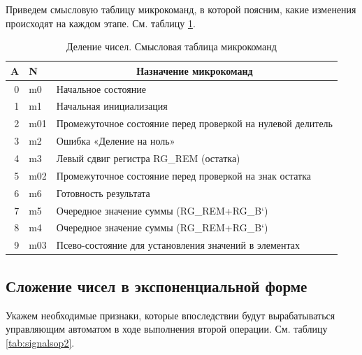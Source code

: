 \documentclass[a4paper,14pt]{extarticle}
\begin{document}
Приведем смысловую таблицу микрокоманд, в которой поясним, какие изменения происходят на каждом этапе. См. таблицу \ref{tab:coursedivmeaning}.
\begin{table}[h!]
		\small
	\begin{tabular}{|r||l|l|}

		\hline
		\multicolumn{1}{|l||}{\textbf{A}} & \textbf{N} & \multicolumn{1}{c|}{\textbf{Назначение микрокоманд}} \\ \hline\hline
		0 & m0 & Начальное состояние \\ \hline
		1 & m1 & Начальная инициализация \\ \hline
		2 & m01 & Промежуточное состояние перед проверкой на нулевой делитель \\ \hline
		3 & m2 & Ошибка «Деление на ноль» \\ \hline
		4 & m3 & Левый сдвиг регистра RG\_REM (остатка) \\ \hline
		5 & m02 & Промежуточное состояние перед проверкой на знак остатка \\ \hline
		6 & m6 & Готовность результата \\ \hline
		7 & m5 & Очередное значение суммы (RG\_REM+RG\_B`) \\ \hline
		8 & m4 & Очередное значение суммы (RG\_REM+RG\_B`) \\ \hline
		9 & m03 & Псево-состояние для установления значений в элементах \\ \hline
	\end{tabular}
	\caption{Деление чисел. Смысловая таблица микрокоманд}
	\label{tab:coursedivmeaning}
\end{table}
	

\subsection{Сложение чисел в экспоненциальной форме}

Укажем необходимые признаки, которые впоследствии будут вырабатываться управляющим автоматом в ходе выполнения второй операции. См. таблицу \ref{tab:signalsop2}.
\end{document}
